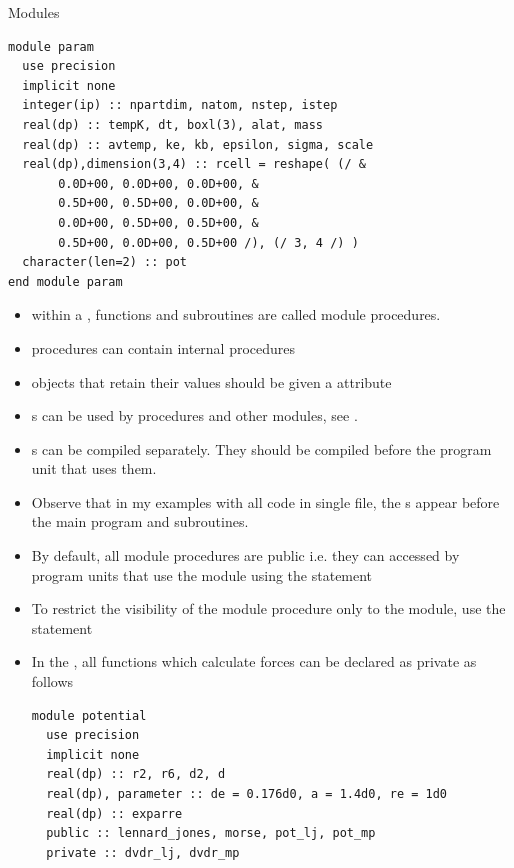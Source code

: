 \documentclass[10pt,t]{beamer}
\begin{document}
\begin{frame}{Modules}
\begin{lstlisting}[language={[90]Fortran},basicstyle=\fontsize{4}{5}\selectfont\ttfamily,multicols=2]
module param
  use precision
  implicit none
  integer(ip) :: npartdim, natom, nstep, istep
  real(dp) :: tempK, dt, boxl(3), alat, mass
  real(dp) :: avtemp, ke, kb, epsilon, sigma, scale
  real(dp),dimension(3,4) :: rcell = reshape( (/ &
       0.0D+00, 0.0D+00, 0.0D+00, &
       0.5D+00, 0.5D+00, 0.0D+00, &
       0.0D+00, 0.5D+00, 0.5D+00, &
       0.5D+00, 0.0D+00, 0.5D+00 /), (/ 3, 4 /) )
  character(len=2) :: pot
end module param
  \end{lstlisting}
  \vspace{-0.5cm}
  \begin{itemize}
    \item within a , functions and subroutines are called module procedures.
    \item {} procedures can contain internal procedures
    \item {} objects that retain their values should be given a  attribute
    \item {}s can be used by procedures and other modules, see .
    \item {}s can be compiled separately. {\color{red}They should be compiled before the program unit that uses them}.
    \item[] Observe that in my examples with all code in single file, the s appear before the main program and subroutines.
  \end{itemize}

  \framebreak
    \begin{itemize}
      \item By default, all module procedures are public i.e. they can accessed by program units that use the module using the  statement
      \item To restrict the visibility of the module procedure only to the module, use the  statement
      \item In the , all functions which calculate forces can be declared as private as follows
        \begin{lstlisting}[language={[90]Fortran},basicstyle=\fontsize{5}{6}\selectfont\ttfamily,mathescape]
module potential
  use precision
  implicit none
  real(dp) :: r2, r6, d2, d
  real(dp), parameter :: de = 0.176d0, a = 1.4d0, re = 1d0
  real(dp) :: exparre
  public :: lennard_jones, morse, pot_lj, pot_mp
  private :: dvdr_lj, dvdr_mp
  

\end{lstlisting}
\end{itemize}
\end{frame}
\end{document}
